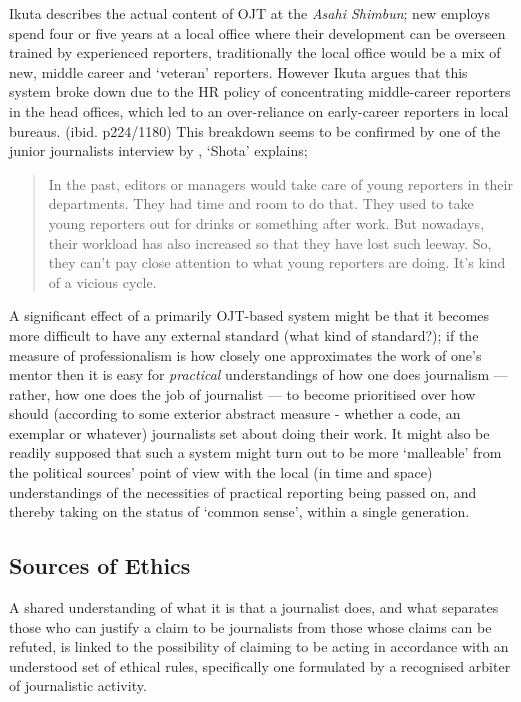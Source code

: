 \documentclass[11pt, headings=normal]{scrartcl}
\begin{document}
Ikuta describes the actual content of OJT at the \emph{Asahi Shimbun};
new employs spend four or five years at a local office where their
development can be overseen trained by experienced reporters,
traditionally the local office would be a mix of new, middle career and
`veteran' reporters. However Ikuta argues that this system broke down
due to the HR policy of concentrating middle-career reporters in the
head offices, which led to an over-reliance on early-career reporters in
local bureaus. (ibid. p224/1180) This breakdown seems to be confirmed by
one of the junior journalists interview by \textcite[242]{Minami:2011},
`Shota' explains;

\begin{quote}
In the past, editors or managers would take care of young reporters in
their departments. They had time and room to do that. They used to take
young reporters out for drinks or something after work. But nowadays,
their workload has also increased so that they have lost such leeway.
So, they can't pay close attention to what young reporters are doing.
It's kind of a vicious cycle.
\end{quote}

A significant effect of a primarily OJT-based system might be that it
becomes more difficult to have any external standard (what kind of
standard?); if the measure of professionalism is how closely one
approximates the work of one's mentor then it is easy for
\emph{practical} understandings of how one does journalism --- rather,
how one does the job of journalist --- to become prioritised over how
should (according to some exterior abstract measure - whether a code, an
exemplar or whatever) journalists set about doing their work. It might
also be readily supposed that such a system might turn out to be more
`malleable' from the political sources' point of view with the local (in
time and space) understandings of the necessities of practical reporting
being passed on, and thereby taking on the status of `common sense',
within a single generation.

\hypertarget{sources-of-ethics}{%
\subsection{Sources of Ethics}\label{sources-of-ethics}}

A shared understanding of what it is that a journalist does, and what
separates those who can justify a claim to be journalists from those
whose claims can be refuted, is linked to the possibility of claiming to
be acting in accordance with an understood set of ethical rules,
specifically one formulated by a recognised arbiter of journalistic
activity.
\end{document}
